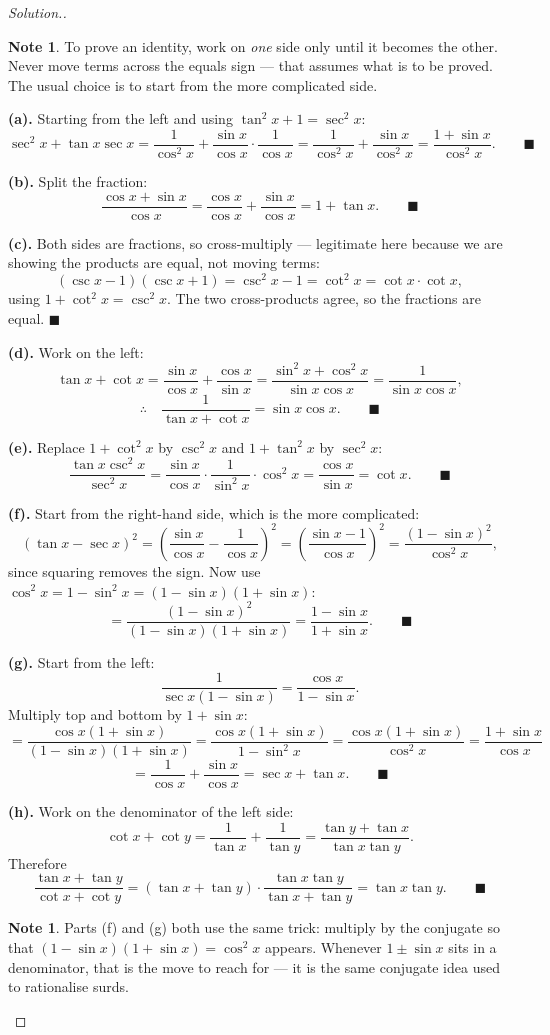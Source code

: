 \documentclass[11pt,a4paper]{article}
\theoremstyle{definition}
\newtheorem{note}[thm]{Note}
\newenvironment{solution}
  {\renewcommand{\qedsymbol}{}\begin{proof}[\textit{Solution}.]}
  {\end{proof}}
\begin{document}
\begin{solution}
\begin{note}
To prove an identity, work on \emph{one} side only until it becomes the other. Never
move terms across the equals sign --- that assumes what is to be proved. The usual
choice is to start from the more complicated side.
\end{note}

\textbf{(a).} Starting from the left and using $\tan^2x+1=\sec^2x$:
$$\sec^2x+\tan x\sec x=\frac{1}{\cos^2x}+\frac{\sin x}{\cos x}\cdot\frac{1}{\cos x}
=\frac{1}{\cos^2x}+\frac{\sin x}{\cos^2x}=\frac{1+\sin x}{\cos^2x}.\qquad\blacksquare$$

\textbf{(b).} Split the fraction:
$$\frac{\cos x+\sin x}{\cos x}=\frac{\cos x}{\cos x}+\frac{\sin x}{\cos x}
=1+\tan x.\qquad\blacksquare$$

\textbf{(c).} Both sides are fractions, so cross-multiply --- legitimate here because we
are showing the products are equal, not moving terms:
$$(\csc x-1)(\csc x+1)=\csc^2x-1=\cot^2x=\cot x\cdot\cot x,$$
using $1+\cot^2x=\csc^2x$. The two cross-products agree, so the fractions are
equal. $\blacksquare$

\textbf{(d).} Work on the left:
$$\tan x+\cot x=\frac{\sin x}{\cos x}+\frac{\cos x}{\sin x}
=\frac{\sin^2x+\cos^2x}{\sin x\cos x}=\frac{1}{\sin x\cos x},$$
$$\therefore\quad \frac{1}{\tan x+\cot x}=\sin x\cos x.\qquad\blacksquare$$

\textbf{(e).} Replace $1+\cot^2x$ by $\csc^2x$ and $1+\tan^2x$ by $\sec^2x$:
$$\frac{\tan x\csc^2x}{\sec^2x}=\frac{\sin x}{\cos x}\cdot\frac{1}{\sin^2x}
\cdot\cos^2x=\frac{\cos x}{\sin x}=\cot x.\qquad\blacksquare$$

\textbf{(f).} Start from the right-hand side, which is the more complicated:
$$(\tan x-\sec x)^2=\left(\frac{\sin x}{\cos x}-\frac{1}{\cos x}\right)^2
=\left(\frac{\sin x-1}{\cos x}\right)^2=\frac{(1-\sin x)^2}{\cos^2x},$$
since squaring removes the sign. Now use $\cos^2x=1-\sin^2x=(1-\sin x)(1+\sin x)$:
$$=\frac{(1-\sin x)^2}{(1-\sin x)(1+\sin x)}=\frac{1-\sin x}{1+\sin x}.
\qquad\blacksquare$$

\textbf{(g).} Start from the left:
$$\frac{1}{\sec x(1-\sin x)}=\frac{\cos x}{1-\sin x}.$$
Multiply top and bottom by $1+\sin x$:
$$=\frac{\cos x(1+\sin x)}{(1-\sin x)(1+\sin x)}=\frac{\cos x(1+\sin x)}{1-\sin^2x}
=\frac{\cos x(1+\sin x)}{\cos^2x}=\frac{1+\sin x}{\cos x}$$
$$=\frac{1}{\cos x}+\frac{\sin x}{\cos x}=\sec x+\tan x.\qquad\blacksquare$$

\textbf{(h).} Work on the denominator of the left side:
$$\cot x+\cot y=\frac{1}{\tan x}+\frac{1}{\tan y}=\frac{\tan y+\tan x}{\tan x\tan y}.$$
Therefore
$$\frac{\tan x+\tan y}{\cot x+\cot y}
=(\tan x+\tan y)\cdot\frac{\tan x\tan y}{\tan x+\tan y}=\tan x\tan y.
\qquad\blacksquare$$

\begin{note}
Parts (f) and (g) both use the same trick: multiply by the conjugate so that
$(1-\sin x)(1+\sin x)=\cos^2 x$ appears. Whenever $1\pm\sin x$ sits in a denominator,
that is the move to reach for --- it is the same conjugate idea used to rationalise
surds.
\end{note}
\end{solution}
\end{document}
